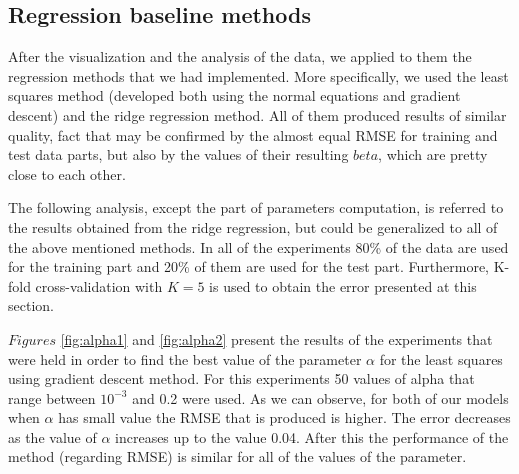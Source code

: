 \subsection{Regression baseline methods}
After the visualization and the analysis of the data, we applied to them the regression methods that we had implemented. More specifically, we used the least squares method (developed both using the normal equations and gradient descent) and the ridge regression method. All of them produced results of similar quality, fact that may be confirmed by the almost equal RMSE for training and test data parts, but also by the values of their resulting $beta$, which are pretty close to each other.

The following analysis, except the part of parameters computation, is referred to the results obtained from the ridge regression, but could be generalized to all of the above mentioned methods. In all of the experiments 80\% of the data are used for the training part and 20\% of them are used for the test part. Furthermore, K-fold cross-validation  with $K=5$ is used to obtain the error presented at this section.

$Figures$ \ref{fig:alpha1} and \ref{fig:alpha2} present the results of the experiments that were held in order to find the best value of the parameter $\alpha$ for the least squares using gradient descent method. For this experiments 50 values of alpha that range between $10^{-3}$ and 0.2 were used. As we can observe, for both of our models when $\alpha$ has small value the RMSE that is produced is higher. The error decreases as the value of $\alpha$ increases up to the value 0.04. After this the performance of the method (regarding RMSE) is similar for all of the values of the parameter.

